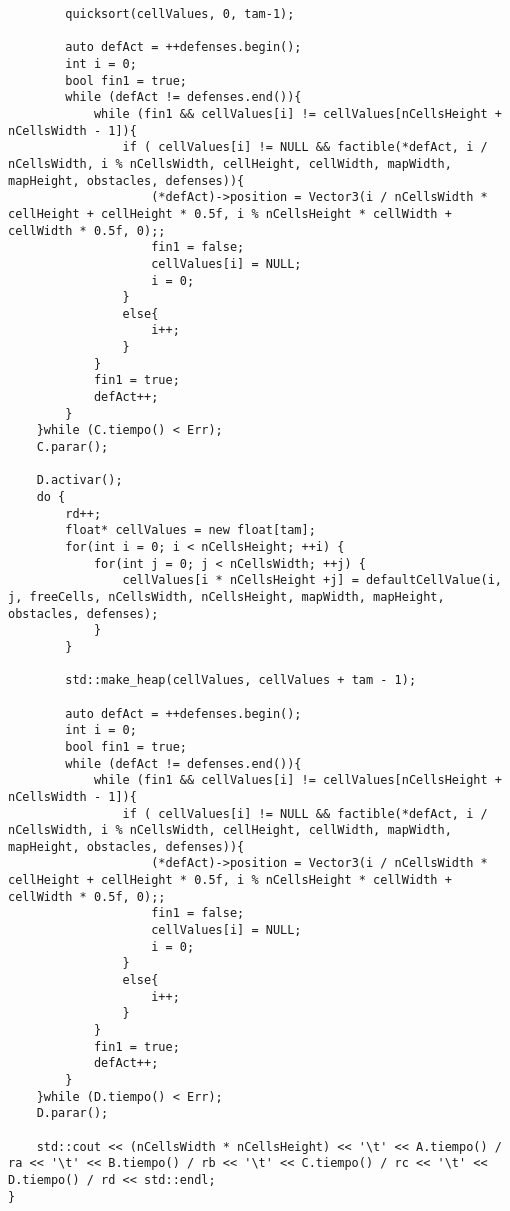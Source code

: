 \begin{lstlisting}
        quicksort(cellValues, 0, tam-1);

        auto defAct = ++defenses.begin();
        int i = 0;
        bool fin1 = true;
        while (defAct != defenses.end()){
            while (fin1 && cellValues[i] != cellValues[nCellsHeight + nCellsWidth - 1]){
                if ( cellValues[i] != NULL && factible(*defAct, i / nCellsWidth, i % nCellsWidth, cellHeight, cellWidth, mapWidth, mapHeight, obstacles, defenses)){
                    (*defAct)->position = Vector3(i / nCellsWidth * cellHeight + cellHeight * 0.5f, i % nCellsHeight * cellWidth + cellWidth * 0.5f, 0);;
                    fin1 = false;
                    cellValues[i] = NULL;
                    i = 0;
                }
                else{
                    i++;
                }
            }
            fin1 = true;
            defAct++;
        }
    }while (C.tiempo() < Err);
    C.parar();

    D.activar();
    do {
        rd++;
        float* cellValues = new float[tam]; 
        for(int i = 0; i < nCellsHeight; ++i) {
            for(int j = 0; j < nCellsWidth; ++j) {
                cellValues[i * nCellsHeight +j] = defaultCellValue(i, j, freeCells, nCellsWidth, nCellsHeight, mapWidth, mapHeight, obstacles, defenses);
            }
        }

        std::make_heap(cellValues, cellValues + tam - 1);

        auto defAct = ++defenses.begin();
        int i = 0;
        bool fin1 = true;
        while (defAct != defenses.end()){
            while (fin1 && cellValues[i] != cellValues[nCellsHeight + nCellsWidth - 1]){
                if ( cellValues[i] != NULL && factible(*defAct, i / nCellsWidth, i % nCellsWidth, cellHeight, cellWidth, mapWidth, mapHeight, obstacles, defenses)){
                    (*defAct)->position = Vector3(i / nCellsWidth * cellHeight + cellHeight * 0.5f, i % nCellsHeight * cellWidth + cellWidth * 0.5f, 0);;
                    fin1 = false;
                    cellValues[i] = NULL;
                    i = 0;
                }
                else{
                    i++;
                }
            }
            fin1 = true;
            defAct++;
        }
    }while (D.tiempo() < Err);
    D.parar();

    std::cout << (nCellsWidth * nCellsHeight) << '\t' << A.tiempo() / ra << '\t' << B.tiempo() / rb << '\t' << C.tiempo() / rc << '\t' << D.tiempo() / rd << std::endl;
}
\end{lstlisting}